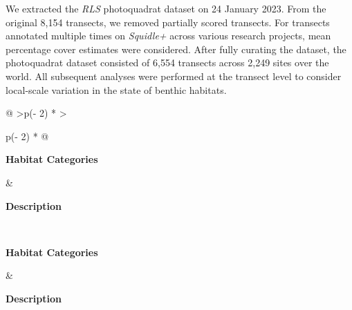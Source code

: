 \begin{refsection}
We extracted the \emph{RLS} photoquadrat dataset on 24 January 2023.
From the original 8,154 transects, we removed partially scored
transects. For transects annotated multiple times on \emph{Squidle+}
across various research projects, mean percentage cover estimates were
considered. After fully curating the dataset, the photoquadrat dataset
consisted of 6,554 transects across 2,249 sites over the world. All
subsequent analyses were performed at the transect level to consider
local-scale variation in the state of benthic habitats.

\hypertarget{tbl:chap2table1}{}
\begin{longtable}[]{@{}
  >{\centering\arraybackslash}p{(\columnwidth - 2\tabcolsep) * }
  >{\raggedright\arraybackslash}p{(\columnwidth - 2\tabcolsep) * }@{}}
\caption[Description of the 24 categories used in
this study to overall capture the diversity of habitat types sampled by
\emph{Reef Life Surveys} worldwide.]{\label{tbl:chap2table1}Description of the 24 categories used in
this study to overall capture the diversity of habitat types sampled by
\emph{Reef Life Surveys} worldwide. The 50 original \emph{RLS}
categories were lumped into these 24 categories that represent
ecologically-consistent groups associated with different levels of
structural complexity.}\tabularnewline
\toprule\noalign{}
\begin{minipage}[b]{\linewidth}\centering
\textbf{Habitat Categories}
\end{minipage} & \begin{minipage}[b]{\linewidth}\raggedright
\textbf{Description}
\end{minipage} \\
\midrule\noalign{}
\endfirsthead
\toprule\noalign{}
\begin{minipage}[b]{\linewidth}\centering
\textbf{Habitat Categories}
\end{minipage} & \begin{minipage}[b]{\linewidth}\raggedright
\textbf{Description}
\end{minipage} \\
\midrule\noalign{}
\endhead
\bottomrule\noalign{}
\endlastfoot
{}\\\hline


\end{longtable}
\end{refsection}
